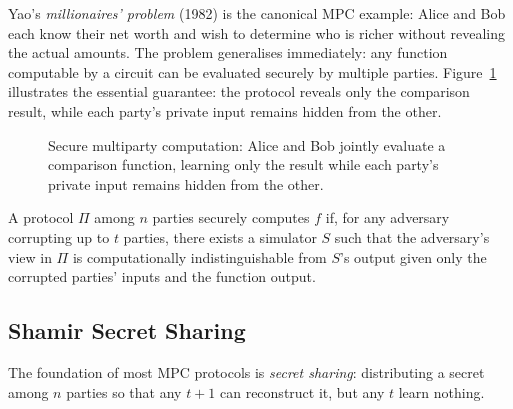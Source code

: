 Yao's \emph{millionaires' problem} (1982) is the canonical MPC example: Alice and Bob each know their net worth and wish to determine who is richer without revealing the actual amounts.  The problem generalises immediately: any function computable by a circuit can be evaluated securely by multiple parties.  Figure~\ref{fig:ch16-mpc} illustrates the essential guarantee: the protocol reveals only the comparison result, while each party's private input remains hidden from the other.

\begin{figure}[t]
\centering
{}
\caption{Secure multiparty computation: Alice and Bob jointly evaluate a comparison function, learning only the result while each party's private input remains hidden from the other.}
\label{fig:ch16-mpc}
\end{figure}

\begin{definition}
\label{def:mpc}
A protocol $\Pi$ among $n$ parties securely computes $f$ if, for any adversary corrupting up to $t$ parties, there exists a simulator $S$ such that the adversary's view in $\Pi$ is computationally indistinguishable from $S$'s output given only the corrupted parties' inputs and the function output.
\end{definition}


\subsection{Shamir Secret Sharing}
\label{subsec:shamir}

The foundation of most MPC protocols is \emph{secret sharing}: distributing a secret among $n$ parties so that any $t+1$ can reconstruct it, but any $t$ learn nothing.

